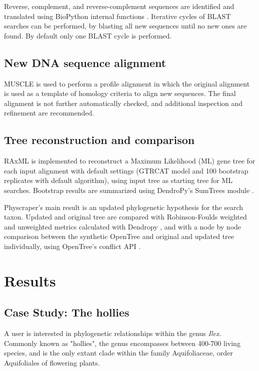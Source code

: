 \documentclass{bmcart}
\begin{document}
Reverse, complement, and reverse-complement sequences are identified and translated
using BioPython internal functions \cite{cock2009biopython}.
Iterative cycles of BLAST searches can be performed, by blasting all new sequences
until no new ones are found. By default only one BLAST cycle is performed.

\subsection*{New DNA sequence alignment}

MUSCLE \cite{edgar2004muscle} is used to perform a profile alignment in which the
original alignment is used as a template of homology criteria to align new sequences.
The final alignment is not further automatically checked, and additional inspection
and refinement are recommended.

\subsection*{Tree reconstruction and comparison}

RAxML \cite{stamatakis2014raxml} is implemented to reconstruct a Maximum Likelihood
(ML) gene tree for each input alignment with default settings (GTRCAT model and
100 bootstrap replicates with default algorithm), using input tree as starting
tree for ML searches.
Bootstrap results are summarized using DendroPy's SumTrees module
\cite{sukumaran2010dendropy}.

Physcraper's main result is an updated phylogenetic hypothesis for the search taxon.
Updated and original tree are compared with Robinson-Foulds weighted and unweighted
metrics calculated with Dendropy \cite{sukumaran2010dendropy}, and with a node by node
comparison between the synthetic OpenTree and original and updated tree individually,
using OpenTree's conflict API \cite{redelings2017supertree}.


\section*{Results}
\subsection*{Case Study: The hollies}

A user is interested in phylogenetic relationships within the genus \textit{Ilex}. Commonly
known as "hollies", the genus encompasses between 400-700 living species, and is
the only extant clade within the family Aquifoliaceae, order Aquifoliales of flowering
plants.
\end{document}
